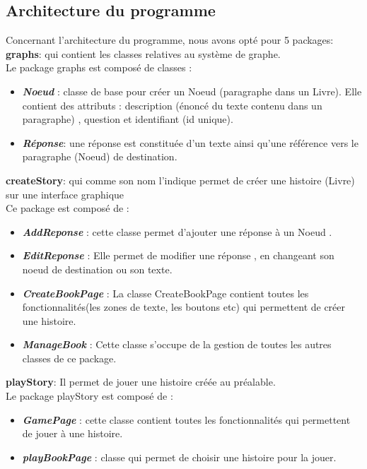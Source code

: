 \documentclass[12pt]{article}
\begin{document}
	    \subsection{Architecture du programme}
	    Concernant l'architecture du programme, nous avons opté pour 5 packages:\\
	\textbf{graphs}: qui contient les classes relatives au système de graphe.\\
	Le package graphs est composé de classes  :
	\begin{itemize}
		\item \textbf{\textit{Noeud}} : classe de base pour créer un Noeud (paragraphe dans un Livre). Elle contient des attributs : description (énoncé du texte contenu dans un paragraphe) , question  et identifiant (id unique).
		 \item \textbf{\textit{Réponse}}: une réponse est constituée d'un texte ainsi qu'une référence vers le paragraphe (Noeud) de destination.
	\end{itemize}
	\textbf{createStory}: qui comme son nom l'indique permet de créer une histoire (Livre) sur une interface graphique \\	Ce package est composé de :
	\begin{itemize}
		\item \textbf{\textit{AddReponse}} : cette classe permet d'ajouter une réponse à un Noeud .
		 \item \textbf{\textit{EditReponse }}: Elle permet de modifier une réponse , en changeant son noeud de destination ou son texte.
		  \item \textbf{\textit{CreateBookPage }}: La classe CreateBookPage  contient toutes les fonctionnalités(les zones de texte, les boutons etc)  qui permettent de créer une histoire.
		  \item \textbf{\textit{ManageBook }}: Cette classe s'occupe de la gestion de toutes les autres classes de ce package.
	\end{itemize}
	\textbf{playStory}: Il permet de jouer une histoire créée au préalable. \\
	Le package playStory est composé de :
	\begin{itemize}
		\item \textbf{\textit{GamePage}} : cette classe contient toutes les fonctionnalités qui permettent de jouer à une histoire.
		 \item \textbf{\textit{playBookPage }}: classe qui permet de choisir une histoire pour la jouer.
	\end{itemize}
\end{document}
